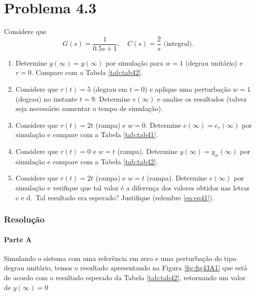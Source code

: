 \documentclass[
]{book}
\providecommand{\tightlist}{%
  \setlength{\itemsep}{0pt}\setlength{\parskip}{0pt}}
\theoremstyle{definition}
\theoremstyle{definition}
\theoremstyle{definition}
\theoremstyle{remark}
\begin{document}
\hypertarget{problema-4.3}{%
\section*{Problema 4.3}\label{problema-4.3}}

Considere que
\[
G(s) = \frac {1}{0.5s +1}, \quad C(s) = \frac {2}{s} \text{ (integral)}.
\]

\begin{enumerate}
\def\labelenumi{\alph{enumi}.}
\tightlist
\item
  Determine \(y(\infty) = y(\infty)\) por simulação para \(w =1\) (degrau unitário) e \(r=0\). Compare com a Tabela \ref{tab:tab42}.
\item
  Considere que \(r(t) = 5\) (degrau em \(t=0\)) e aplique uma perturbação \(w=1\) (degrau) no instante \(t=9\). Determine \(e(\infty)\) e analise os resultados (talvez seja necessário aumentar o tempo de simulação).
\item
  Considere que \(r(t) = 2t\) (rampa) e \(w=0\). Determine \(e(\infty) = e_r(\infty)\) por simulação e compare com a Tabela \ref{tab:tab41}.
\item
  Considere que \(r(t) = 0\) e \(w=t\) (rampa). Determine \(y(\infty) = y_w(\infty)\) por simulação e compare com a Tabela \ref{tab:tab42}.
\item
  Considere que \(r(t) = 2t\) (rampa) e \(w=t\) (rampa). Determine \(e(\infty)\) por simulação e verifique que tal valor é a diferença dos valores obtidos nas letras c e d.~Tal resultado era esperado? Justifique (relembre \eqref{eq:eq41}).
\end{enumerate}

\hypertarget{resoluuxe7uxe3o-11}{%
\subsubsection*{Resolução}\label{resoluuxe7uxe3o-11}}

\hypertarget{parte-a-3}{%
\paragraph{Parte A}\label{parte-a-3}}

Simulando o sistema com uma referência em zero e uma perturbação do tipo degrau unitário, temos o resultado apresentando na Figura \ref{fig:fig43A1} que está de acordo com o resultado esperado da Tabela \ref{tab:tab42}, retornando um valor de \(y(\infty) = 0\)
\end{document}

